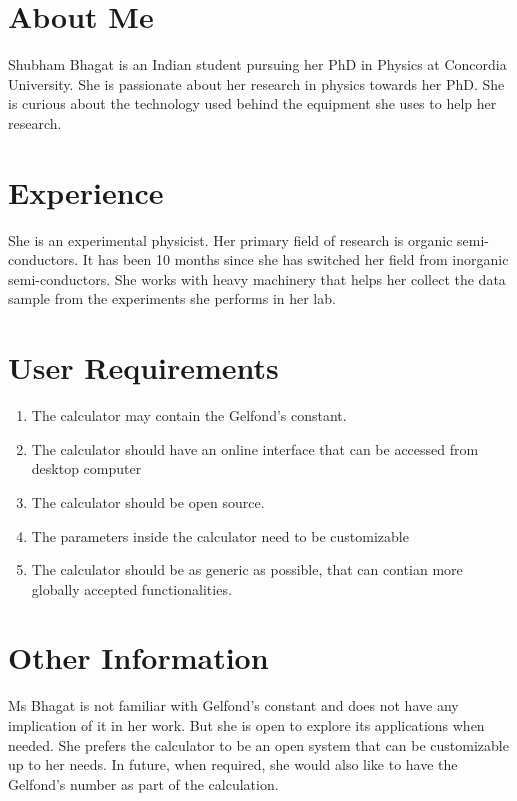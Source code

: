 \documentclass[letterpaper]{twentysecondcv}
\begin{document}
\makeprofile

\section{About Me}

Shubham Bhagat is an Indian student pursuing her PhD in Physics at Concordia University. She is passionate about her research in physics towards her PhD. She is curious about the technology used behind the equipment she uses to help her research. \newline

\section{Experience}

She is an experimental physicist. Her primary field of research is organic semi-conductors. It has been 10 months since she has switched her field from inorganic semi-conductors. She works with heavy machinery that helps her collect the data sample from the experiments she performs in her lab.    \newline

\section{User Requirements}

\begin{enumerate}
 
   \item The calculator may contain the Gelfond's constant.
   \item The calculator should have an online interface that can be accessed from desktop computer
   \item The calculator should be open source.
   \item The parameters inside the calculator need to be customizable
   \item The calculator should be as generic as possible, that can contian more globally accepted functionalities.
    \newline  
\end{enumerate}

\section{Other Information}

Ms Bhagat is not familiar with Gelfond's constant and does not have any implication of it in her work. But she is open to explore its applications when needed. She prefers the calculator to be an open system that can be customizable up to her needs. In future, when required, she would also like to have the Gelfond's number as part of the calculation. \newline
\end{document}
